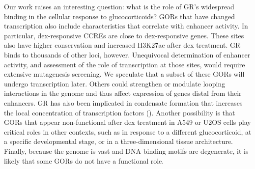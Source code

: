 \documentclass{article}
\begin{document}
{Our work raises an interesting question: what is the role of GR’s widespread binding in the cellular response to glucocorticoids? GORs that have changed transcription also include characteristics that correlate with enhancer activity. In particular, dex-responsive CCREs are close to dex-responsive genes. These sites also have higher conservation and increased H3K27ac after dex treatment. GR binds to thousands of other loci, however. Unequivocal determination of enhancer activity, and assessment of the role of transcription at those sites, would require extensive mutagenesis screening. We speculate that a subset of these GORs will undergo transcription later. Others could strengthen or modulate looping interactions in the genome and thus affect expression of genes distal from their enhancers. GR has also been implicated in condensate formation that increases the local concentration of transcription factors (\cite{garcia_intrinsically_2021}). Another possibility is that GORs that appear non-functional after dex treatment in A549 or U2OS cells play critical roles in other contexts, such as in response to a different glucocorticoid, at a specific developmental stage, or in a three-dimensional tissue architecture. Finally, because the genome is vast and DNA binding motifs are degenerate, it is likely that some GORs do not have a functional role.
	
}
\end{document}
